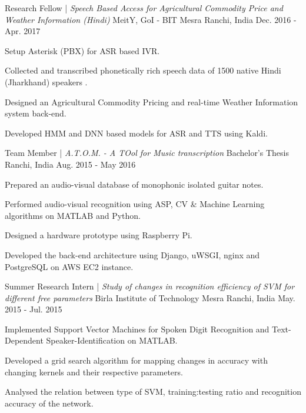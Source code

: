 \vspace{-1em}
\begin{cventries}
  \cventry
  {Research Fellow | \textit{Speech Based Access for Agricultural Commodity Price and Weather Information (Hindi)}}
  {MeitY, GoI - BIT Mesra}
  {Ranchi, India}
  {Dec. 2016 - Apr. 2017}
  { \begin{cvitems}  		
		\item {Setup Asterisk (PBX) for ASR based IVR.}
  		\item {Collected and transcribed phonetically rich speech data of 1500 native Hindi (Jharkhand) speakers .}
		\item {Designed an Agricultural Commodity Pricing and real-time Weather Information system back-end.}
		\item {Developed HMM and DNN based models for ASR and TTS using Kaldi.}
  	\end{cvitems}
  }	
    
  \cventry
  {Team Member | \textit{A.T.O.M. - A TOol for Music transcription}}
  {Bachelor's Thesis}
  {Ranchi, India}
  {Aug. 2015 - May 2016} 
  { \begin{cvitems}
     \item {Prepared an audio-visual database of monophonic isolated guitar notes.}
     \item {Performed audio-visual recognition using ASP, CV \& Machine Learning algorithms on MATLAB and Python.}
     \item {Designed a hardware prototype using Raspberry Pi.}
     \item {Developed the back-end architecture using Django, uWSGI, nginx and PostgreSQL on AWS EC2 instance.}
    \end{cvitems}
  } 
    
  \cventry
    {Summer Research Intern | \textit{Study of changes in recognition efficiency of SVM for different free parameters}}
    {Birla Institute of Technology Mesra}
    {Ranchi, India}
    {May. 2015 - Jul. 2015}    
    {
      \begin{cvitems}
        \item {Implemented Support Vector Machines for Spoken Digit Recognition and Text-Dependent Speaker-Identification on MATLAB.}
        \item {Developed a grid search algorithm for mapping changes in accuracy with changing kernels and their respective parameters.}
        \item {Analysed the relation between type of SVM, training:testing ratio and recognition accuracy of the network.}
      \end{cvitems}
    }


\end{cventries}
